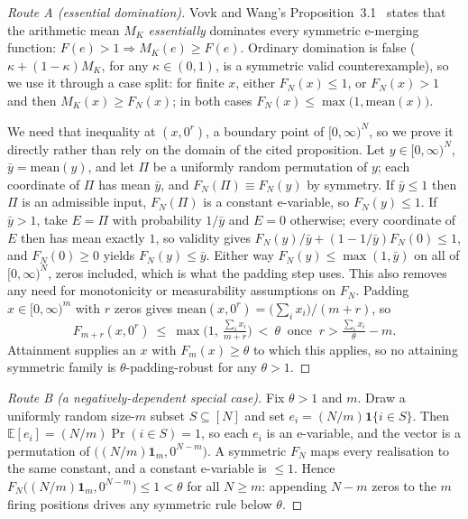 \begin{proof}[Route A (essential domination)]
Vovk and Wang's Proposition~3.1~\cite{vovk2021evalues} states that the arithmetic mean $M_K$
\emph{essentially} dominates every symmetric e-merging function: $F(e)>1\Rightarrow M_K(e)\ge F(e)$.
Ordinary domination is false ($\kappa+(1-\kappa)M_K$, for any $\kappa\in(0,1)$, is a symmetric valid counterexample), so we
use it through a case split: for finite $x$, either $F_N(x)\le1$, or $F_N(x)>1$ and then
$M_K(x)\ge F_N(x)$; in both cases $F_N(x)\le\max\!\big(1,\mathrm{mean}(x)\big)$.

We need that inequality at $(x,0^r)$, a boundary point of $[0,\infty)^N$, so we prove it directly
rather than rely on the domain of the cited proposition. Let $y\in[0,\infty)^N$, $\bar y=\mathrm{mean}(y)$,
and let $\Pi$ be a uniformly random permutation of $y$; each coordinate of $\Pi$ has mean $\bar y$, and
$F_N(\Pi)\equiv F_N(y)$ by symmetry. If $\bar y\le1$ then $\Pi$ is an admissible input, $F_N(\Pi)$ is a
constant e-variable, so $F_N(y)\le1$. If $\bar y>1$, take $E=\Pi$ with probability $1/\bar y$ and
$E=0$ otherwise; every coordinate of $E$ then has mean exactly $1$, so validity gives
$F_N(y)/\bar y+(1-1/\bar y)F_N(0)\le1$, and $F_N(0)\ge0$ yields $F_N(y)\le\bar y$. Either way
$F_N(y)\le\max(1,\bar y)$ on all of $[0,\infty)^N$, zeros included, which is what the padding step uses.
This also removes any need for monotonicity or measurability assumptions on $F_N$. Padding
$x\in[0,\infty)^m$ with $r$ zeros gives $\mathrm{mean}(x,0^r)=\big(\sum_i x_i\big)/(m+r)$, so
\[
F_{m+r}(x,0^r)\ \le\ \max\!\Big(1,\ \tfrac{\sum_i x_i}{m+r}\Big)\ <\ \theta
\ \text{ once }\ r>\tfrac{\sum_i x_i}{\theta}-m .
\]
Attainment supplies an $x$ with $F_m(x)\ge\theta$ to which this applies, so no attaining symmetric
family is $\theta$-padding-robust for any $\theta>1$.
\end{proof}

\begin{proof}[Route B (a negatively-dependent special case)]
Fix $\theta>1$ and $m$. Draw a uniformly random size-$m$ subset $S\subseteq[N]$ and set
$e_i=(N/m)\mathbf{1}\{i\in S\}$. Then $\mathbb{E}[e_i]=(N/m)\Pr(i\in S)=1$, so each $e_i$ is an
e-variable, and the vector is a permutation of $\big((N/m)\mathbf{1}_m,0^{N-m}\big)$. A symmetric
$F_N$ maps every realisation to the same constant, and a constant e-variable is $\le1$. Hence
$F_N\big((N/m)\mathbf{1}_m,0^{N-m}\big)\le1<\theta$ for all $N\ge m$: appending $N-m$ zeros to the
$m$ firing positions drives any symmetric rule below $\theta$.
\end{proof}


